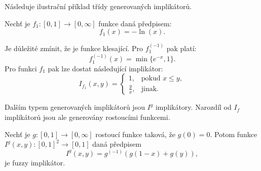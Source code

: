 Následuje ilustrační příklad třídy generovaných implikátor\r u.\\
\begin{example}
    Nech\v t je $f_1:[0,1] \rightarrow [0,
\infty]$ funkce daná předpisem:
 $$f_1(x)= -\ln(x).$$

Je d\r uležité zmínit, že je funkce klesající. Pro $f_1^{(-1)}$ pak platí:
 $$f_1^{(-1)}(x)=\min \{ e^{-x},1 \}.$$
Pro  funkci $f_1$ pak lze dostat následující implik\'ator:
$$I_{f_1}(x,y)= \begin{cases} 1,    &\mbox{pokud $x \leq y$}, \\
  \frac{y}{x},   & \mbox{jinak.} \end{cases}$$
\end{example}

Dalším typem generovaných implikátor\r u jsou $I^g$ implikátory. Narozdíl od $I_f$ implikátor\r u jsou ale generovány rostoucími funkcemi.

\begin{sentence} \cite{smutna}
    Nech\v t je  $g:[0,1]\rightarrow [0,\infty]$ rostoucí funkce takov\'a, \v ze $g(0)=0$. 
    Potom funkce $I^g(x,y):[0,1]^2 \rightarrow [0,1]$ dan\'a předpisem
    $$I^g(x,y)=g^{(-1)}(g(1-x)+g(y)),$$
    je fuzzy implik\'ator.\\
\end{sentence}

